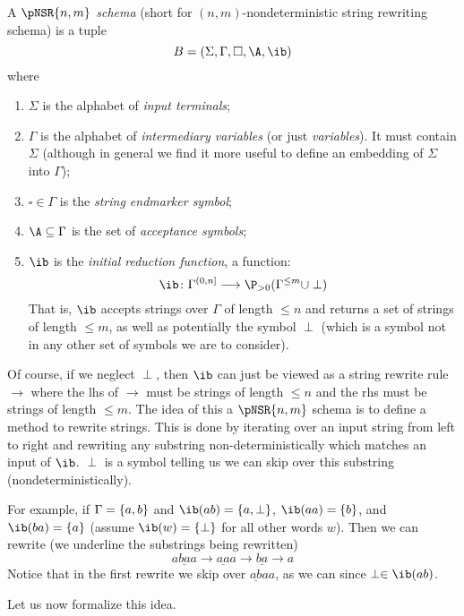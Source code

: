 \documentclass{llncs}
\begin{document}
\begin{definition}

    A \emph{$\pNSR{n,m}$ schema} (short for $(n,m)$-nondeterministic string rewriting schema) is a tuple
    $$ B = (\Sigma,\Gamma,\square,\A,\ib) $$
    where
    \begin{enumerate}
        \item $\Sigma$ is the alphabet of \emph{input terminals};
        \item $\Gamma$ is the alphabet of \emph{intermediary variables} (or just \emph{variables}).
        It must contain $\Sigma$ (although in general we find it more useful to define an embedding of $\Sigma$ into $\Gamma$);
        \item $\square\in\Gamma$ is the \emph{string endmarker symbol};
        \item $\A\subseteq\Gamma$ is the set of \emph{acceptance symbols};
        \item $\ib$ is the \emph{initial reduction function}, a function:
        $$ \ib\colon\Gamma^{(0,n]}\longto\P_{>0}(\Gamma^{\leq m}\cup\perp) $$
        That is, $\ib$ accepts strings over $\Gamma$ of length $\leq n$ and returns a set of strings of length $\leq m$, as well as potentially the symbol $\perp$ (which is a symbol not in any other set of symbols we are to
        consider).
    \end{enumerate}

\end{definition}

Of course, if we neglect $\perp$, then $\ib$ can just be viewed as a string rewrite rule $\to$ where the lhs of $\to$ must be strings of length $\leq n$ and the rhs must be strings of length $\leq m$.
The idea of this a $\pNSR{n,m}$ schema is to define a method to rewrite strings.
This is done by iterating over an input string from left to right and rewriting any substring non-deterministically which matches an input of $\ib$.
$\perp$ is a symbol telling us we can skip over this substring (nondeterministically).

For example, if $\Gamma=\set{a,b}$ and $\ib(ab)=\set{a,\perp}$, $\ib(aa)=\set{b}$, and $\ib(ba)=\set{a}$ (assume $\ib(w)=\set\perp$ for all other words $w$).
Then we can rewrite (we underline the substrings being rewritten)
$$ a\underline{ba}a \to \underline{aa}a \to \underline{ba} \to a $$
Notice that in the first rewrite we skip over $\underline{ab}aa$, as we can since $\perp\in\ib(ab)$.

Let us now formalize this idea.
\end{document}

